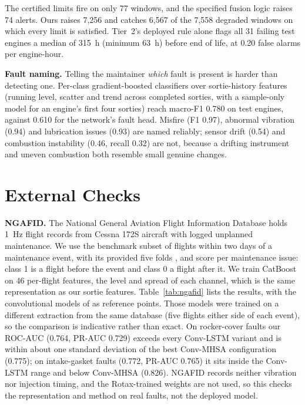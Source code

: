The certified limits fire on only 77 windows, and the specified fusion logic raises 74 alerts. Ours raises 7,256 and catches 6,567 of the 7,558 degraded windows on which every limit is satisfied. Tier~2's deployed rule alone flags all 31 failing test engines a median of 315~h (minimum 63~h) before end of life, at 0.20 false alarms per engine-hour.

\noindent\textbf{Fault naming.} Telling the maintainer \emph{which} fault is present is harder than detecting one. Per-class gradient-boosted classifiers over sortie-history features (running level, scatter and trend across completed sorties, with a sample-only model for an engine's first four sorties) reach macro-F1 0.780 on test engines, against 0.610 for the network's fault head. Misfire (F1 0.97), abnormal vibration (0.94) and lubrication issues (0.93) are named reliably; sensor drift (0.54) and combustion instability (0.46, recall 0.32) are not, because a drifting instrument and uneven combustion both resemble small genuine changes.

\section{External Checks}
\label{sec:ext}

\noindent\textbf{NGAFID.} The National General Aviation Flight Information Database holds 1~Hz flight records from Cessna 172S aircraft with logged unplanned maintenance. We use the benchmark subset of flights within two days of a maintenance event, with its provided five folds \citep{yang2022dataset}, and score per maintenance issue: class 1 is a flight before the event and class 0 a flight after it. We train CatBoost on 46 per-flight features, the level and spread of each channel, which is the same representation as our sortie features. Table~\ref{tab:ngafid} lists the results, with the convolutional models of \citet{yang2022ngafid} as reference points. Those models were trained on a different extraction from the same database (five flights either side of each event), so the comparison is indicative rather than exact. On rocker-cover faults our ROC-AUC (0.764, PR-AUC 0.729) exceeds every Conv-LSTM variant and is within about one standard deviation of the best Conv-MHSA configuration (0.775); on intake-gasket faults (0.772, PR-AUC 0.765) it sits inside the Conv-LSTM range and below Conv-MHSA (0.826). NGAFID records neither vibration nor injection timing, and the Rotax-trained weights are not used, so this checks the representation and method on real faults, not the deployed model.

